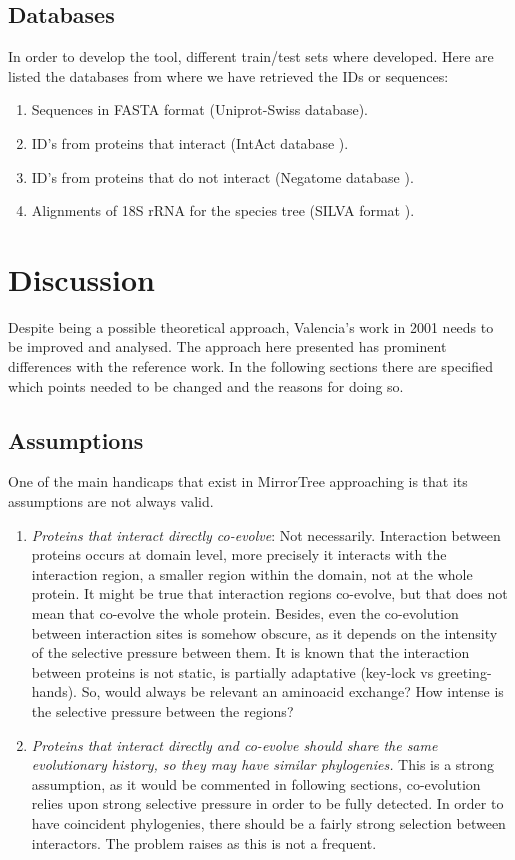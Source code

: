 \documentclass[11pt]{article}
\begin{document}
\subsection{Databases}
In order to develop the tool, different train/test sets where developed. Here are listed the databases from where we have retrieved the IDs or sequences:
\begin{enumerate}
\setlength{\itemsep}{1pt}
	\item Sequences in FASTA format (Uniprot-Swiss database).
	\item ID's from proteins that interact (IntAct database \cite{intact}).
	\item ID's from proteins that do not interact (Negatome database \cite{negatome}).
	\item Alignments of 18S rRNA for the species tree (SILVA format \cite{SILVA}).
\end{enumerate}

\section{Discussion}
Despite being a possible theoretical approach, Valencia's work in 2001\cite{Pazos2001} needs to be improved and analysed. The approach here presented has prominent differences with the reference work. In the following sections there are specified which points needed to be changed and the reasons for doing so.

\subsection{Assumptions}
One of the main handicaps that exist in MirrorTree approaching is that its assumptions are not always valid.
\begin{enumerate}
\setlength{\itemsep}{1pt}
	\item \textit{Proteins that interact directly co-evolve}: Not necessarily. Interaction between proteins occurs at domain level, more precisely it interacts with the interaction region, a smaller region within the domain, not at the whole protein. It might be true that interaction regions co-evolve, but that does not mean that co-evolve the whole protein. Besides, even the co-evolution between interaction sites is somehow obscure, as it depends on the intensity of the selective pressure between them. It is known that the interaction between proteins is not static, is partially adaptative (key-lock vs greeting-hands). So, would always be relevant an aminoacid exchange? How intense is the selective pressure between the regions?
	\item \textit{Proteins that interact directly and co-evolve should share the same evolutionary history, so they may have similar phylogenies.} This is a strong assumption, as it would be commented in following sections, co-evolution relies upon strong selective pressure in order to be fully detected. In order to have coincident phylogenies, there should be a fairly strong selection between interactors. The problem raises as this is not a frequent.
\end{enumerate}
\end{document}
